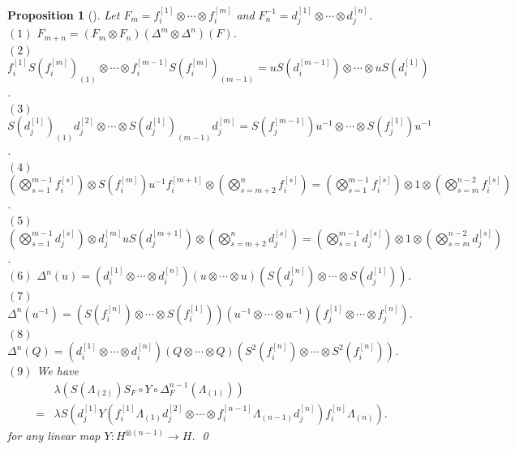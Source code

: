 \documentclass[12pt]{amsart}
\newtheorem{prop}{Proposition}
\begin{document}
\begin{prop}[{\cite[Lem.\ 5.2]{CNW25}}]\label{cocycle}
Let $F_m=f^{[1]}_i\otimes\cdots\otimes f^{[m]}_i$ and $F^{-1}_n=d^{[1]}_j\otimes\cdots\otimes d^{[n]}_j$.\\
\medskip
\noindent$(1)$ $F_{m+n}=(F_m\otimes F_n)(\Delta^m\otimes\Delta^n)(F)$.\\
\medskip
\noindent$(2)$ $f^{[1]}_iS(f^{[m]}_i)_{(1)}\otimes\cdots\otimes f^{[m-1]}_iS(f^{[m]}_i)_{(m-1)}=uS(d^{[m-1]}_i)\otimes\cdots\otimes uS(d^{[1]}_i)$.\\
\medskip
\noindent$(3)$ $S(d^{[1]}_j)_{(1)}d^{[2]}_j\otimes\cdots\otimes S(d^{[1]}_j)_{(m-1)}d^{[m]}_j=S(f^{[m-1]}_j)u^{-1}\otimes\cdots\otimes S(f^{[1]}_j)u^{-1}$.\\
\medskip
\noindent$(4)$ $\left(\bigotimes\limits_{s=1}^{m-1}f^{[s]}_i\right)\otimes S(f^{[m]}_i)u^{-1}f^{[m+1]}_i\otimes\left(\bigotimes\limits_{s=m+2}^{n}f^{[s]}_i\right)=\left(\bigotimes\limits_{s=1}^{m-1}f^{[s]}_i\right)\otimes 1\otimes\left(\bigotimes\limits_{s=m}^{n-2}f^{[s]}_i\right)$.\\
\medskip
\noindent$(5)$ $\left(\bigotimes\limits_{s=1}^{m-1}d^{[s]}_j\right)\otimes d^{[m]}_juS(d^{[m+1]}_j)\otimes\left(\bigotimes\limits_{s=m+2}^{n}d^{[s]}_j\right)=\left(\bigotimes\limits_{s=1}^{m-1}d^{[s]}_j\right)\otimes 1\otimes\left(\bigotimes\limits_{s=m}^{n-2}d^{[s]}_j\right)$.\\
\medskip
\noindent$(6)$
$\Delta^n(u)=(d^{[1]}_i\otimes\cdots\otimes d^{[n]}_i)(u\otimes\cdots\otimes u)(S(d^{[n]}_j)\otimes\cdots\otimes S(d^{[1]}_j))$.\\
\medskip
\noindent$(7)$
$\Delta^n(u^{-1})=(S(f^{[n]}_i)\otimes\cdots\otimes S(f^{[1]}_i))(u^{-1}\otimes\cdots\otimes u^{-1})(f^{[1]}_j\otimes\cdots\otimes f^{[n]}_j)$.\\
\medskip
\noindent$(8)$ 
$\Delta^n(Q)=(d^{[1]}_i\otimes\cdots\otimes d^{[n]}_i)(Q\otimes\cdots\otimes Q)(S^2(f^{[n]}_i)\otimes\cdots\otimes S^2(f^{[n]}_i))$.\\
\medskip
\noindent$(9)$ We have
\[\begin{aligned}
&\lambda(S(\Lambda_{(2)})S_F\circ Y\circ\Delta_F^{n-1}(\Lambda_{(1)}))\\
=&\lambda S (d^{[1]}_jY(f^{[1]}_i\Lambda_{(1)}d^{[2]}_j\otimes\cdots\otimes f^{[n-1]}_i\Lambda_{(n-1)}d^{[n]}_j)f^{[n]}_i\Lambda_{(n)}).
\end{aligned}\]
for any linear map $Y:H^{\otimes(n-1)}\rightarrow H$. \qed
\end{prop}
\end{document}
